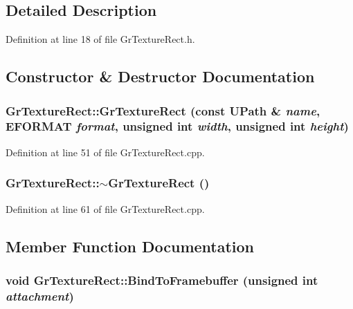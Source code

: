 \subsection{Detailed Description}


Definition at line 18 of file GrTextureRect.h.

\subsection{Constructor \& Destructor Documentation}
\hypertarget{class_gr_texture_rect_d9e2adcc0e64b50e658eb43d80a00368}{
\subsubsection[{GrTextureRect}]{\setlength{\rightskip}{0pt plus 5cm}GrTextureRect::GrTextureRect (const {\bf UPath} \& {\em name}, \/  {\bf EFORMAT} {\em format}, \/  unsigned int {\em width}, \/  unsigned int {\em height})}}
\label{class_gr_texture_rect_d9e2adcc0e64b50e658eb43d80a00368}




Definition at line 51 of file GrTextureRect.cpp.\hypertarget{class_gr_texture_rect_cb5a5fe6cd3041f7c75a6ab5e624ad98}{
\subsubsection[{$\sim$GrTextureRect}]{\setlength{\rightskip}{0pt plus 5cm}GrTextureRect::$\sim$GrTextureRect ()}}
\label{class_gr_texture_rect_cb5a5fe6cd3041f7c75a6ab5e624ad98}




Definition at line 61 of file GrTextureRect.cpp.

\subsection{Member Function Documentation}
\hypertarget{class_gr_texture_rect_a50c4865b823b882367fed497667f77b}{
\subsubsection[{BindToFramebuffer}]{\setlength{\rightskip}{0pt plus 5cm}void GrTextureRect::BindToFramebuffer (unsigned int {\em attachment})}}
\label{class_gr_texture_rect_a50c4865b823b882367fed497667f77b}




